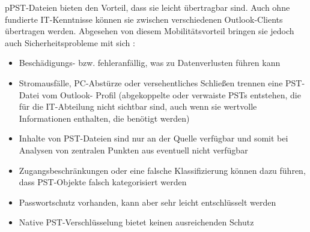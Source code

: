 \noindent pPST-Dateien bieten den Vorteil, dass sie leicht übertragbar sind. Auch ohne fundierte IT-Kenntnisse können sie zwischen verschiedenen Outlook-Clients übertragen werden. Abgesehen von diesem Mobilitätsvorteil bringen sie jedoch auch Sicherheitsprobleme mit sich \cite{.26.06.2022}:

\begin{itemize}
    \item Beschädigungs- bzw. fehleranfällig, was zu Datenverlusten führen kann
    \item Stromausfälle, PC-Abstürze oder versehentliches Schließen trennen eine PST-Datei vom Outlook-
    Profil (abgekoppelte oder verwaiste PSTs entstehen, die für die IT-Abteilung nicht sichtbar sind,
    auch wenn sie wertvolle Informationen enthalten, die benötigt werden)
    \item Inhalte von PST-Dateien sind nur an der Quelle verfügbar und somit bei Analysen von zentralen Punkten aus eventuell nicht verfügbar
    \item Zugangsbeschränkungen oder eine falsche Klassifizierung können dazu führen, dass PST-Objekte
    falsch kategorisiert werden
    \item Passwortschutz vorhanden, kann aber sehr leicht entschlüsselt werden
    \item Native PST-Verschlüsselung bietet keinen ausreichenden Schutz
\end{itemize}